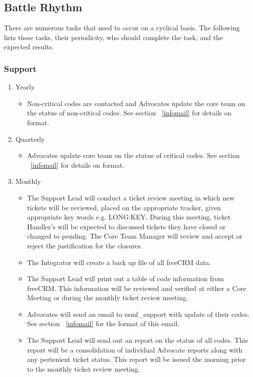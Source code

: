 \subsection{Battle Rhythm}
\label{battle}
There are numerous tasks that need to occur on a cyclical basis. The following lists these tasks, their periodicity, who should complete the task, and the expected results.

\subsubsection{Support}
\begin{enumerate}

\item Yearly
 \begin{itemize}
 \item Non-critical codes are contacted and Advocates update the core team on the status of non-critical codes. See section ~\ref{infomail} for details on format.
 \end{itemize}

\item Quarterly
 \begin{itemize}
 \item Advocates update core team on the status of critical codes. See section ~\ref{infomail} for details on format.
 \end{itemize}

\item Monthly
  \begin{itemize}
  \item The Support Lead will conduct a ticket review meeting in which new tickets will be reviewed, placed on the appropriate tracker, given appropriate key words e.g. LONG:KEY. During this meeting, ticket Handler's will be expected to discussed tickets they have closed or changed to pending. The Core Team Manager will review and accept or reject the justification for the closures.
   \item The Integrator will create a back up file of all freeCRM data.
   \item The Support Lead will print out a table of code information from freeCRM. This information will be reviewed and verified at either a Core Meeting or during the monthly ticket review meeting. 
   \item Advocates will send an email to esmf\_support with update of their codes. See section ~\ref{infomail} for the format of this email.
   \item The Support Lead will send out an report on the status of all codes. This report will be a consolidation of individual Advocate reports along with any pertenient ticket status. This report will be issued the morning prior to the monthly ticket review meeting. 
  \end{itemize}


\end{enumerate}
